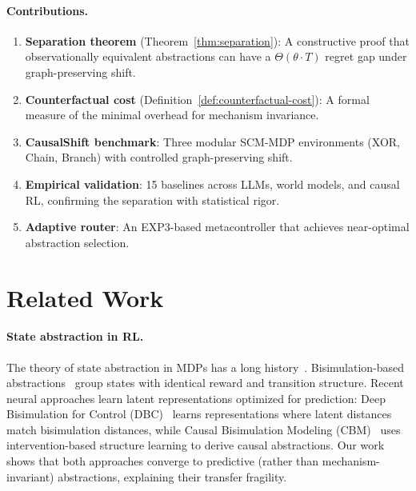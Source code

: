 \documentclass[runningheads]{llncs}
\begin{document}
\paragraph{Contributions.}
\begin{enumerate}
    \item \textbf{Separation theorem} (Theorem~\ref{thm:separation}): A constructive proof that observationally equivalent abstractions can have a $\Theta(\theta \cdot T)$ regret gap under graph-preserving shift.
    \item \textbf{Counterfactual cost} (Definition~\ref{def:counterfactual-cost}): A formal measure of the minimal overhead for mechanism invariance.
    \item \textbf{CausalShift benchmark}: Three modular SCM-MDP environments (XOR, Chain, Branch) with controlled graph-preserving shift.
    \item \textbf{Empirical validation}: 15 baselines across LLMs, world models, and causal RL, confirming the separation with statistical rigor.
    \item \textbf{Adaptive router}: An EXP3-based metacontroller that achieves near-optimal abstraction selection.
\end{enumerate}

\section{Related Work}
\label{sec:related}

\paragraph{State abstraction in RL.} The theory of state abstraction in MDPs has a long history~\cite{li2006towards,abel2018state}. Bisimulation-based abstractions~\cite{ferns2004metrics} group states with identical reward and transition structure. Recent neural approaches learn latent representations optimized for prediction: Deep Bisimulation for Control (DBC)~\cite{zhang2021learning} learns representations where latent distances match bisimulation distances, while Causal Bisimulation Modeling (CBM)~\cite{wang2024building} uses intervention-based structure learning to derive causal abstractions. Our work shows that both approaches converge to predictive (rather than mechanism-invariant) abstractions, explaining their transfer fragility.
\end{document}
